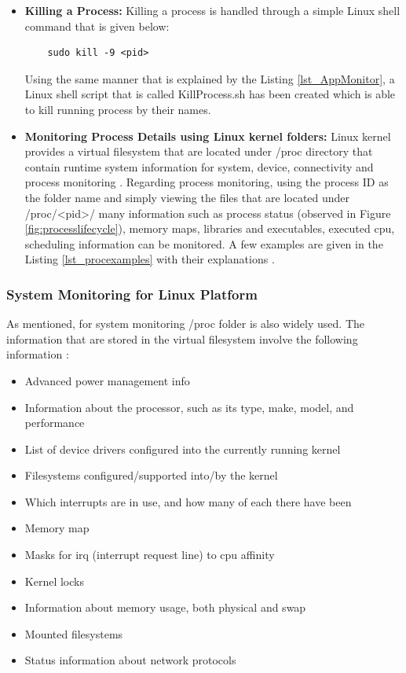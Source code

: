 \begin{itemize}
	\item \textbf{Killing a Process:} Killing a process is handled through a simple Linux shell command that is given below:
	\begin{lstlisting}
	sudo kill -9 <pid>
	\end{lstlisting}
	Using the same manner that is explained by the Listing \ref{lst_AppMonitor}, a Linux shell script that is called KillProcess.sh has been created which is able to kill running process by their names.
	\item \textbf{Monitoring Process Details using Linux kernel folders:} Linux kernel provides a virtual filesystem that are located under /proc directory that contain runtime system information for system, device, connectivity and process monitoring \cite{linuxproc}. Regarding process monitoring, using the process ID as the folder name and simply viewing the files that are located under /proc/<pid>/ many information such as process status (observed in Figure \ref{fig:processlifecycle}), memory maps, libraries and executables, executed cpu, scheduling information can be monitored. A few examples are given in the Listing \ref{lst_procexamples} with their explanations \cite{linuxproc}.
	
	
\end{itemize} 

\subsubsection{System Monitoring for Linux Platform}
As mentioned, for system monitoring /proc folder is also widely used. The information that are stored in the virtual filesystem involve the following information \cite{linuxproc}:
\begin{itemize}
	\item Advanced power management info
	\item Information about the processor, such as its type, make, model, and performance
	\item  List of device drivers configured into the currently running kernel
	\item Filesystems configured/supported into/by the kernel
	\item Which interrupts are in use, and how many of each there have been
	\item Memory map
	\item Masks for irq (interrupt request line) to cpu affinity
	\item Kernel locks
	\item Information about memory usage, both physical and swap
	\item Mounted filesystems
	\item Status information about network protocols
\end{itemize}

